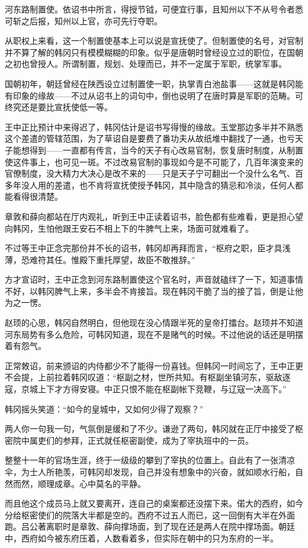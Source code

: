 河东路制置使。依诏书中所言，得授节钺，可便宜行事，且知州以下不从号令者悉可斩之后报，知州以上官，亦可先行夺职。

从职权上来看，这一个制置使基本上可以说是宣抚使了。但制置使的名号，对官制并不算了解的韩冈只有模模糊糊的印象。似乎是唐朝时曾经设立过的职位，在国朝之初也曾授人。所谓制置，规划、处理而已，并不一定属于军职，统掌军事。


国朝初年，朝廷曾经在陕西设立过制置使一职，执掌青白池盐事——这就是韩冈能有印象的缘故——不过从诏书上的词句中，倒也说明了在唐时算是军职的范畴。可终究还是要比宣抚使低一等。

王中正比预计中来得迟了，韩冈估计是诏书写得慢的缘故。玉堂那边多半并不熟悉这个差遣的管辖范围，为了草诏自是要费了番功夫从故纸堆中翻找了一通，也亏天子能想得到——一直都有传言，当今的天子有心改易官制，恢复唐时制度，从制置使这件事上，也可见一斑。不过改易官制的事现如今是不可能了，几百年演变来的官僚制度，没大精力大决心是改不来的——只是天子宁可翻出一个没什么名气、百多年没人用的差遣，也不肯将宣抚使授予韩冈，其中隐含的猜忌和冷淡，任何人都能看得很清楚。

章敦和薛向都站在厅内观礼，听到王中正读着诏书，脸色都有些难看，更是担心望向韩冈，生怕他跟王安石不相上下的牛脾气上来，场面可就难看了。

不过等王中正念完那份并不长的诏书，韩冈却再拜而言，“枢府之职，臣才具浅薄，恐难符其任。惟殿下重托厚望，故臣不敢推辞。”

方才宣诏时，王中正念到河东路制置使这个官名时，声音就磕绊了一下，知道事情不好，以韩冈脾气上来，多半会不肯接旨。现在韩冈干脆了当的接了旨，倒是让他为之一愣。

赵顼的心思，韩冈自然明白，但他现在没心情跟半死的皇帝打擂台。赵顼并不知道河东局势有多么危险，可韩冈知道，现在不是赌气的时候。不过他说的话还是明摆着有怨气。

正常敇诏，前来颁诏的内侍都少不了能得一份喜钱。但韩冈一时间忘了，王中正更不会提，上前拉着韩冈叹道：“枢副之材，世所共知。有枢副坐镇河东，驱敌逐寇，京城上下才方得安寝。中正只恨不能在枢副帐下竞鞭，与辽寇一决高下。”

韩冈摇头笑道：“如今的皇城中，又如何少得了观察？”

两人你一句我一句，气氛倒是缓和了不少。谦逊了两句，韩冈就在正厅中接受了枢密院中属吏们的参拜，正式就任枢密副使，成为了宰执班中的一员。

整整十一年的官场生涯，终于一级级的攀到了宰执的位置上。自此有了一张清凉伞，为士人所艳羡，可韩冈却发现，自己并没有想象中的兴奋，就如顺水行船，自然而然，顺理成章。心中莫名的平静。

而且他这个成员马上就又要离开，连自己的桌案都还没摆下来。偌大的西府，如今分给枢密使们的院落大半都是空的。西府不过五人而已，这一回倒有大半在外面跑。吕公著离职时是章敦、薛向撑场面，到了现在还是两人在院中撑场面。朝廷中，西府如今被东府压着，人数看着多，但实际在朝中的只为东府的一半。

